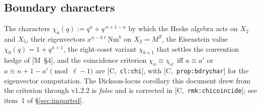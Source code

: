 \documentclass[11pt]{article}
\theoremstyle{remark}
\newcommand{\HA}[1]{[C,~\texttt{#1}]}      %
\newcommand{\Mnote}[1]{[M~\S#1]}            %
\begin{document}
\subsection{Boundary characters}\label{sec:boundary}
The characters $\chi_a(q):=q^a+q^{\,n+1-a}$ by which the Hecke algebra acts on $X_2$ and $X_5$,
their eigenvectors $x^{n-b\ell}\mathrm{Nm}^b$ on $X_2=M^T$, the Eisenstein value
$\chi_0(q)=1+q^{n+1}$, the right-coset variant $\chi_{b+1}$ that settles the convention hedge of
\Mnote{4}, and the coincidence criterion $\chi_a\equiv\chi_{a'}$ iff $a\equiv a'$ or
$a\equiv n+1-a'\pmod{\ell-1}$ are \HA{cl:chi}, with \HA{prop:bdrychar} for the eigenvector
computation. The Dickson-locus corollary this document drew from the criterion through v1.2.2 is
\emph{false} and is corrected in \HA{rmk:chicoincide}; see item~1 of \S\ref{sec:imported}.
\end{document}
